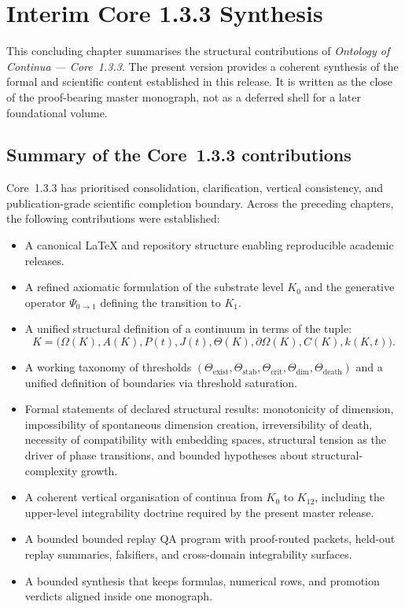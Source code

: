 
\section{Interim Core 1.3.3 Synthesis}
\label{sec:conclusion}

This concluding chapter summarises the structural contributions of
\emph{Ontology of Continua --- Core~1.3.3}. The present version provides a
coherent synthesis of the formal and scientific content established in this
release. It is written as the close of the proof-bearing master monograph,
not as a deferred shell for a later foundational volume.

\subsection{Summary of the Core~1.3.3 contributions}

Core~1.3.3 has prioritised consolidation, clarification, vertical consistency,
and publication-grade scientific completion boundary.
Across the preceding chapters, the following contributions were established:

\begin{itemize}
    \item A canonical \LaTeX{} and repository structure enabling reproducible academic releases.
    \item A refined axiomatic formulation of the substrate level \(K_0\) and the generative operator
          \(\Psi_{0\to 1}\) defining the transition to \(K_1\).
    \item A unified structural definition of a continuum in terms of the tuple:
          \[
              K = \big(\Omega(K), A(K), P(t), J(t), \Theta(K), \partial\Omega(K), C(K), k(K,t)\big).
          \]
    \item A working taxonomy of thresholds
          \((\Theta_{\mathrm{exist}}, \Theta_{\mathrm{stab}}, \Theta_{\mathrm{crit}},
            \Theta_{\mathrm{dim}}, \Theta_{\mathrm{death}})\)
          and a unified definition of boundaries via threshold saturation.
    \item Formal statements of declared structural results:
          monotonicity of dimension,
          impossibility of spontaneous dimension creation,
          irreversibility of death,
          necessity of compatibility with embedding spaces,
          structural tension as the driver of phase transitions,
          and bounded hypotheses about structural-complexity growth.
    \item A coherent vertical organisation of continua from \(K_0\) to \(K_{12}\),
          including the upper-level integrability doctrine required by the present master release.
    \item A bounded bounded replay QA program with proof-routed packets, held-out replay summaries, falsifiers, and cross-domain integrability surfaces.
    \item A bounded synthesis that keeps formulas, numerical rows, and promotion verdicts aligned inside one monograph.
\end{itemize}

